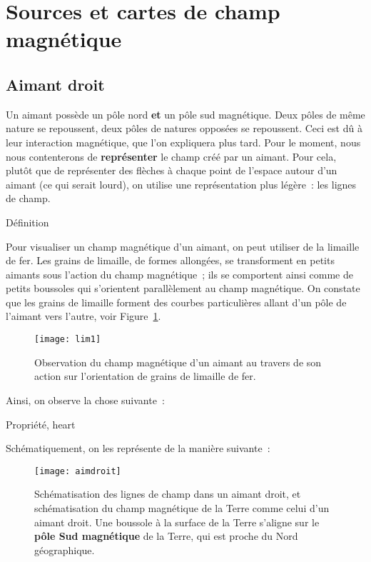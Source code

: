 \documentclass[../main/main.tex]{subfiles}
\begin{document}
\section{Sources et cartes de champ magnétique}
\subsection{Aimant droit}
\label{ssec:aimdroit}
Un aimant possède un pôle nord \textbf{et} un pôle sud magnétique. Deux pôles de
même nature se repoussent, deux pôles de natures opposées se repoussent. Ceci
est dû à leur interaction magnétique, que l'on expliquera plus tard. Pour le
moment, nous nous contenterons de \textbf{représenter} le champ créé par un
aimant. Pour cela, plutôt que de représenter des flèches à chaque point de
l'espace autour d'un aimant (ce qui serait lourd), on utilise une représentation
plus légère~: les lignes de champ.
\begin{tdefi}{Définition}
\end{tdefi}

Pour visualiser un champ magnétique d'un aimant, on peut utiliser de la limaille
de fer. Les grains de limaille, de formes allongées, se transforment en petits
aimants sous l'action du champ magnétique~; ils se comportent ainsi comme de
petits boussoles qui s'orientent parallèlement au champ magnétique. On constate
que les grains de limaille forment des courbes particulières allant d'un pôle de
l'aimant vers l'autre, voir Figure~\ref{fig:lim1}.
\begin{figure}[h]
	\centering
	\texttt{[image: lim1]}
	\caption{Observation du champ magnétique d'un aimant au travers de son action
		sur l'orientation de grains de limaille de fer.}
	\label{fig:lim1}
\end{figure}
Ainsi, on observe la chose suivante~:
\begin{tprop}{Propriété, heart}
\end{tprop}
Schématiquement, on les représente de la manière suivante~:

\begin{figure}[h]
	\centering
	\texttt{[image: aimdroit]}
	\caption{Schématisation des lignes de champ dans un aimant droit, et
		schématisation du champ magnétique de la Terre comme celui d'un aimant droit.
		Une boussole à la surface de la Terre s'aligne sur le \textbf{pôle Sud magnétique}
		de la Terre, qui est proche du Nord géographique.}
	\label{fig:aimdroitterre}
\end{figure}
\end{document}
